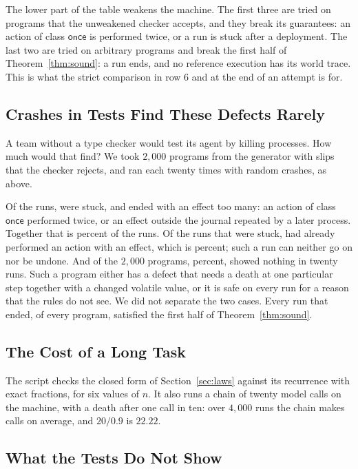 \documentclass[acmsmall,nonacm,screen]{acmart}
\newcommand{\kw}[1]{\mathsf{#1}}
\newcommand{\onceclass}{\kw{once}}
\begin{document}
The lower part of the table weakens the machine. The first three are tried on programs that
the unweakened checker accepts, and they break its guarantees: an action of class
$\onceclass$ is performed twice, or a run is stuck after a deployment. The last two are tried
on arbitrary programs and break the first half of Theorem~\ref{thm:sound}: a run ends, and no
reference execution has its world trace. This is what the strict comparison in row 6 and at
the end of an attempt is for.

\subsection{Crashes in Tests Find These Defects Rarely}
\label{sec:late}

A team without a type checker would test its agent by killing processes. How much would that
find? We took $2{,}000$ programs from the generator with slips that the checker rejects, and
ran each twenty times with random crashes, as above.

Of the \exRejectedRuns{} runs, \exStuck{} were stuck, and \exAstray{} ended with an effect
too many: an action of class $\onceclass$ performed twice, or an effect outside the journal
repeated by a later process. Together that is \exBadPercent{} percent of the runs. Of the
runs that were stuck, \exLate{} had already performed an action with an effect, which is
\exLatePercent{} percent; such a run can neither go on nor be undone. And \exQuiet{} of the
$2{,}000$ programs, \exQuietPercent{} percent, showed nothing in twenty runs. Such a program
either has a defect that needs a death at one particular step together with a changed
volatile value, or it is safe on every run for a reason that the rules do not see. We did not
separate the two cases. Every run that ended, of every program, satisfied the first half of
Theorem~\ref{thm:sound}.

\subsection{The Cost of a Long Task}

The script checks the closed form of Section~\ref{sec:laws} against its recurrence with exact
fractions, for six values of $n$. It also runs a chain of twenty model calls on the machine,
with a death after one call in ten: over $4{,}000$ runs the chain makes \exChainCalls{} calls
on average, and $20 / 0.9$ is $22.22$.

\subsection{What the Tests Do Not Show}
\end{document}
